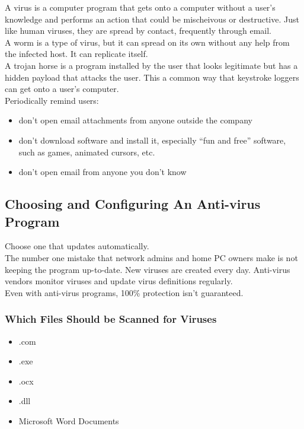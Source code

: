 \documentclass{article}
\begin{document}
A virus is a computer program that gets onto a computer without a user's
knowledge and performs an action that could be mischeivous or destructive.
Just like human viruses, they are spread by contact, frequently through
email.\\

A worm is a type of virus, but it can spread on its own without any help
from the infected host. It can replicate itself.\\

A trojan horse is a program installed by the user that looks legitimate
but has a hidden payload that attacks the user. This a common way that
keystroke loggers can get onto a user's computer.\\

Periodically remind users:

\begin{itemize}

\item don't open email attachments from anyone outside the company

\item don't download software and install it, especially ``fun and free''
software, such as games, animated cursors, etc.

\item don't open email from anyone you don't know

\end{itemize}

\subsection{Choosing and Configuring An Anti-virus Program}

Choose one that updates automatically.\\

The number one mistake that network admins and home PC owners make is not
keeping the program up-to-date. New viruses are created every day. Anti-virus
vendors monitor viruses and update virus definitions regularly.\\

Even with anti-virus programs, 100\% protection isn't guaranteed.

\subsubsection{Which Files Should be Scanned for Viruses}

\begin{itemize}
\item .com
\item .exe
\item .ocx
\item .dll
\item Microsoft Word Documents
\end{itemize}
\end{document}

